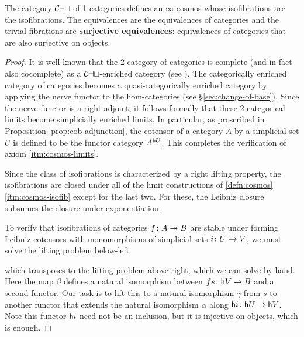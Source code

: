 \begin{proposition}\label{prop:cat-cosmos}
 The category ${\mathord{\mathcal{Cat}}}$ of 1-cat\-e\-go\-ri\-es defines an $\infty$-cosmos whose isofibrations are the isofibrations.
The equivalences are the equivalences of categories and the trivial fibrations are \textbf{surjective equivalences}: equivalences of categories that are also surjective on objects.
\end{proposition}
\begin{proof}
It is well-known that the 2-category of categories is complete (and in fact also cocomplete) as a ${\mathord{\mathcal{Cat}}}$-enriched category (see %
  \cite{Kelly:1989eo}). The categorically enriched category of categories becomes a quasi-categorically enriched category by applying the nerve functor to the hom-categories (see \S\ref{sec:change-of-base}). Since the nerve functor is a right adjoint, it follows formally that these 2-categorical limits become simplicially enriched limits. In particular, as proscribed in Proposition \ref{prop:cob-adjunction}, the cotensor of a category $A$ by a simplicial set $U$ is defined to be the functor category $A^{{\mathord{\mathsf{h}}}{U}}$. This completes the verification of axiom \ref{itm:cosmos-limits}.

Since the class of isofibrations is characterized by a right lifting property, %
  the isofibrations are closed under all of the limit constructions of  \ref{defn:cosmos}\ref{itm:cosmos-isofib} except for the last two. %
  For these, the Leibniz closure subsumes the closure under exponentiation.

To verify that isofibrations of categories $f \colon A \twoheadrightarrow B$ are stable under forming Leibniz cotensors with monomorphisms of simplicial sets $i \colon U \hookrightarrow V$, we must solve the lifting problem below-left
\begin{center}
\end{center}
which transposes to the lifting problem above-right, which we can solve by hand. Here the map $\beta$ defines a natural isomorphism between $fs \colon {\mathord{\mathsf{h}}}{V} \to B$ and a second functor. Our task is to lift this to a natural isomorphism $\gamma$ from $s$ to another functor that extends the natural isomorphism $\alpha$ along ${\mathord{\mathsf{h}}}{i} \colon {\mathord{\mathsf{h}}}{U} \to {\mathord{\mathsf{h}}}{V}$. Note this functor ${\mathord{\mathsf{h}}}{i}$ need not be an inclusion, but it is injective on objects, which is enough.


\end{proof}
